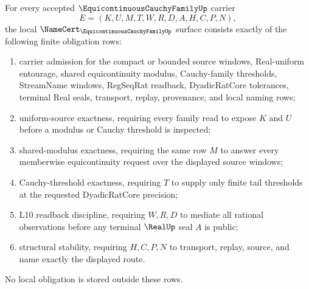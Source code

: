 \begin{theorem}
\label{thm:equicontinuous-cauchy-family-namecert-obligations}
For every accepted $\EquicontinuousCauchyFamilyUp$ carrier
$$
E=(K,U,M,T,W,R,D,A,H,C,P,N),
$$
the local $\NameCert_{\EquicontinuousCauchyFamilyUp}$ surface consists exactly of the following finite obligation rows:
\begin{enumerate}
\item carrier admission for the compact or bounded source windows, Real-uniform entourage, shared equicontinuity modulus, Cauchy-family thresholds, StreamName windows, RegSeqRat readback, DyadicRatCore tolerances, terminal Real seals, transport, replay, provenance, and local naming rows;
\item uniform-source exactness, requiring every family read to expose $K$ and $U$ before a modulus or Cauchy threshold is inspected;
\item shared-modulus exactness, requiring the same row $M$ to answer every memberwise equicontinuity request over the displayed source windows;
\item Cauchy-threshold exactness, requiring $T$ to supply only finite tail thresholds at the requested DyadicRatCore precision;
\item L10 readback discipline, requiring $W,R,D$ to mediate all rational observations before any terminal $\RealUp$ seal $A$ is public;
\item structural stability, requiring $H,C,P,N$ to transport, replay, source, and name exactly the displayed route.
\end{enumerate}
No local obligation is stored outside these rows.
\end{theorem}
